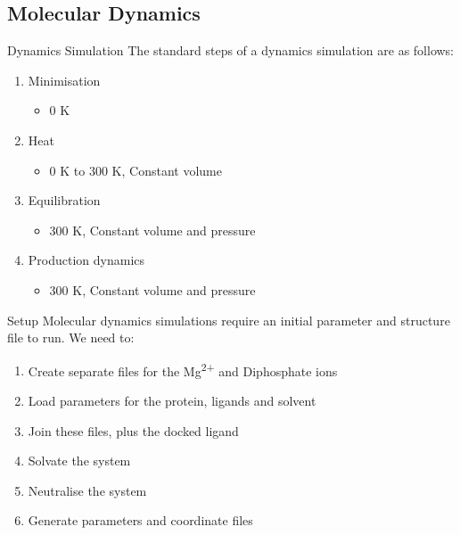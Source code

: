 \subsection{Molecular Dynamics}
\begin{frame}{Dynamics Simulation}
The standard steps of a dynamics simulation are as follows:
\vspace{1cm}
\begin{enumerate}
	\item Minimisation 
	\begin{itemize}
		\item 0 K 
	\end{itemize}
	\item Heat
	\begin{itemize}
		\item 0 K to 300 K, Constant volume
	\end{itemize}
	\item Equilibration
	\begin{itemize}
		\item 300 K, Constant volume and pressure
	\end{itemize}
	\item Production dynamics
	\begin{itemize}
		\item 300 K, Constant volume and pressure
	\end{itemize}
\end{enumerate}
\end{frame}

\begin{frame}{Setup}
Molecular dynamics simulations require an initial parameter and structure file to run.
\vspace{1cm}
\newline
We need to:
\begin{enumerate}
\item Create separate files for the Mg\textsuperscript{2+} and Diphosphate ions
\item Load parameters for the protein, ligands and solvent
\item Join these files, plus the docked ligand
\item Solvate the system
\item Neutralise the system
\item Generate parameters and coordinate files
\end{enumerate}
\end{frame}

